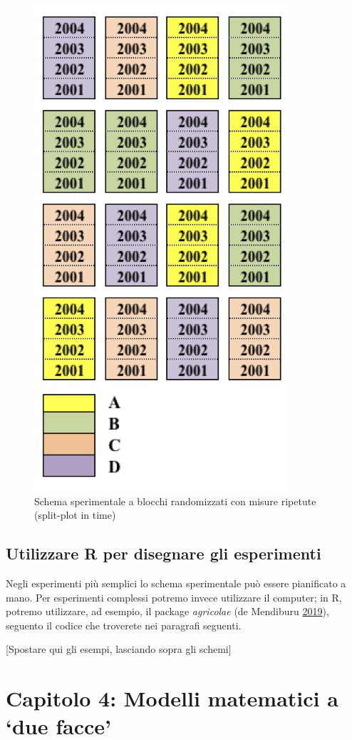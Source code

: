 \documentclass[a4paper,12pt,oneside]{book}
\theoremstyle{definition}
\theoremstyle{definition}
\theoremstyle{definition}
\theoremstyle{remark}
\begin{document}
\begin{figure}

{\centering \includegraphics[width=0.55\linewidth]{_images/Mappa4} 

}

\caption{Schema sperimentale a blocchi randomizzati con misure ripetute (split-plot in time)}\label{fig:figName39}
\end{figure}

\subsection{Utilizzare R per disegnare gli
esperimenti}\label{utilizzare-r-per-disegnare-gli-esperimenti}

Negli esperimenti più semplici lo schema sperimentale può essere
pianificato a mano. Per esperimenti complessi potremo invece utilizzare
il computer; in R, potremo utilizzare, ad esempio, il package
\emph{agricolae} (de Mendiburu
\protect\hyperlink{ref-de-Mendiburu:2019aa}{2019}), seguento il codice
che troverete nei paragrafi seguenti.

{[}Spostare qui gli esempi, lasciando sopra gli schemi{]}

\section{\texorpdfstring{Capitolo 4: Modelli matematici a `due
facce'}{Capitolo 4: Modelli matematici a due facce}}\label{capitolo-4-modelli-matematici-a-due-facce}
\end{document}
